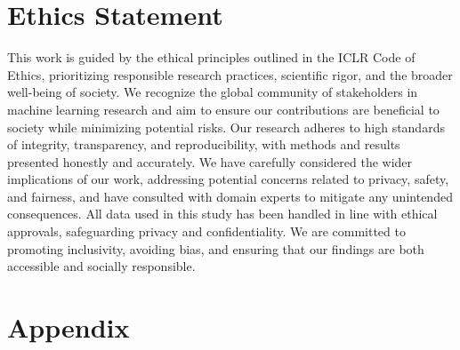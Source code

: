 \documentclass{article} %
\begin{document}
\newpage
\section{Ethics Statement}
This work is guided by the ethical principles outlined in the ICLR Code of Ethics, prioritizing responsible research practices, scientific rigor, and the broader well-being of society. We recognize the global community of stakeholders in machine learning research and aim to ensure our contributions are beneficial to society while minimizing potential risks. Our research adheres to high standards of integrity, transparency, and reproducibility, with methods and results presented honestly and accurately. We have carefully considered the wider implications of our work, addressing potential concerns related to privacy, safety, and fairness, and have consulted with domain experts to mitigate any unintended consequences. All data used in this study has been handled in line with ethical approvals, safeguarding privacy and confidentiality. We are committed to promoting inclusivity, avoiding bias, and ensuring that our findings are both accessible and socially responsible.



\newpage
\section{Appendix}
\appendix
\label{sec: appendix}
\end{document}
